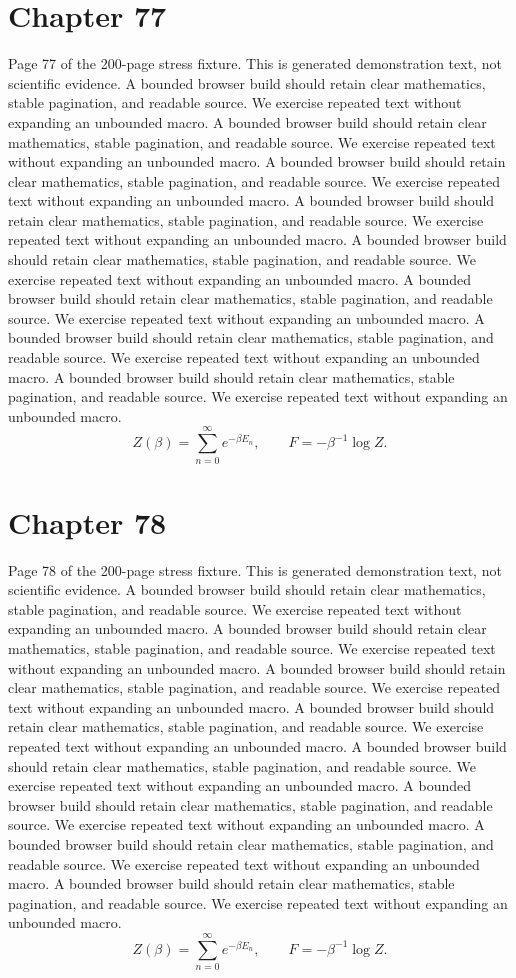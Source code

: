 \documentclass[11pt]{article}
\begin{document}
\section*{Chapter 77}
Page 77 of the 200-page stress fixture. This is generated demonstration text, not scientific evidence.
A bounded browser build should retain clear mathematics, stable pagination, and readable source. We exercise repeated text without expanding an unbounded macro.
A bounded browser build should retain clear mathematics, stable pagination, and readable source. We exercise repeated text without expanding an unbounded macro.
A bounded browser build should retain clear mathematics, stable pagination, and readable source. We exercise repeated text without expanding an unbounded macro.
A bounded browser build should retain clear mathematics, stable pagination, and readable source. We exercise repeated text without expanding an unbounded macro.
A bounded browser build should retain clear mathematics, stable pagination, and readable source. We exercise repeated text without expanding an unbounded macro.
A bounded browser build should retain clear mathematics, stable pagination, and readable source. We exercise repeated text without expanding an unbounded macro.
A bounded browser build should retain clear mathematics, stable pagination, and readable source. We exercise repeated text without expanding an unbounded macro.
A bounded browser build should retain clear mathematics, stable pagination, and readable source. We exercise repeated text without expanding an unbounded macro.
\[Z(\beta)=\sum_{n=0}^{\infty}e^{-\beta E_n},\qquad F=-\beta^{-1}\log Z.\]
\newpage
\section*{Chapter 78}
Page 78 of the 200-page stress fixture. This is generated demonstration text, not scientific evidence.
A bounded browser build should retain clear mathematics, stable pagination, and readable source. We exercise repeated text without expanding an unbounded macro.
A bounded browser build should retain clear mathematics, stable pagination, and readable source. We exercise repeated text without expanding an unbounded macro.
A bounded browser build should retain clear mathematics, stable pagination, and readable source. We exercise repeated text without expanding an unbounded macro.
A bounded browser build should retain clear mathematics, stable pagination, and readable source. We exercise repeated text without expanding an unbounded macro.
A bounded browser build should retain clear mathematics, stable pagination, and readable source. We exercise repeated text without expanding an unbounded macro.
A bounded browser build should retain clear mathematics, stable pagination, and readable source. We exercise repeated text without expanding an unbounded macro.
A bounded browser build should retain clear mathematics, stable pagination, and readable source. We exercise repeated text without expanding an unbounded macro.
A bounded browser build should retain clear mathematics, stable pagination, and readable source. We exercise repeated text without expanding an unbounded macro.
\[Z(\beta)=\sum_{n=0}^{\infty}e^{-\beta E_n},\qquad F=-\beta^{-1}\log Z.\]
\newpage
\end{document}
